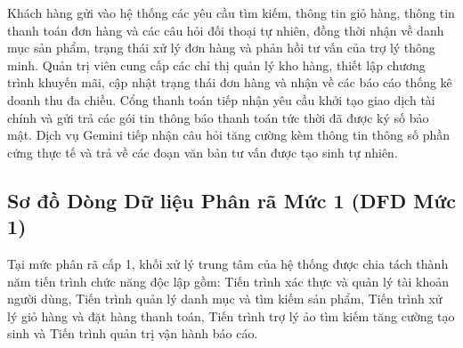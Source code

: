 Khách hàng gửi vào hệ thống các yêu cầu tìm kiếm, thông tin giỏ hàng, thông tin thanh toán đơn hàng và các câu hỏi đối thoại tự nhiên, đồng thời nhận về danh mục sản phẩm, trạng thái xử lý đơn hàng và phản hồi tư vấn của trợ lý thông minh. Quản trị viên cung cấp các chỉ thị quản lý kho hàng, thiết lập chương trình khuyến mãi, cập nhật trạng thái đơn hàng và nhận về các báo cáo thống kê doanh thu đa chiều. Cổng thanh toán tiếp nhận yêu cầu khởi tạo giao dịch tài chính và gửi trả các gói tin thông báo thanh toán tức thời đã được ký số bảo mật. Dịch vụ Gemini tiếp nhận câu hỏi tăng cường kèm thông tin thông số phần cứng thực tế và trả về các đoạn văn bản tư vấn được tạo sinh tự nhiên.

\subsection{Sơ đồ Dòng Dữ liệu Phân rã Mức 1 (DFD Mức 1)}
Tại mức phân rã cấp 1, khối xử lý trung tâm của hệ thống được chia tách thành năm tiến trình chức năng độc lập gồm: Tiến trình xác thực và quản lý tài khoản người dùng, Tiến trình quản lý danh mục và tìm kiếm sản phẩm, Tiến trình xử lý giỏ hàng và đặt hàng thanh toán, Tiến trình trợ lý ảo tìm kiếm tăng cường tạo sinh và Tiến trình quản trị vận hành báo cáo.


